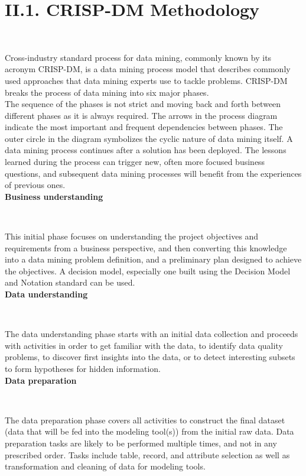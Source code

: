 \documentclass[11pt]{report}
\theoremstyle{plain}
\theoremstyle{definition}
\theoremstyle{definition}
\theoremstyle{proposition}
\begin{document}
\section*{II.1. CRISP-DM Methodology}

\

Cross-industry standard process for data mining, commonly known by its acronym CRISP-DM, is a data mining process model that describes commonly used approaches that data mining experts use to tackle problems. CRISP-DM breaks the process of data mining into six major phases.
\\

The sequence of the phases is not strict and moving back and forth between different phases as it is always required. The arrows in the process diagram indicate the most important and frequent dependencies between phases. The outer circle in the diagram symbolizes the cyclic nature of data mining itself. A data mining process continues after a solution has been deployed. The lessons learned during the process can trigger new, often more focused business questions, and subsequent data mining processes will benefit from the experiences of previous ones.
\\

\textbf{Business understanding}

\

This initial phase focuses on understanding the project objectives and requirements from a business perspective, and then converting this knowledge into a data mining problem definition, and a preliminary plan designed to achieve the objectives. A decision model, especially one built using the Decision Model and Notation standard can be used.
\\

\textbf{Data understanding}

\

The data understanding phase starts with an initial data collection and proceeds with activities in order to get familiar with the data, to identify data quality problems, to discover first insights into the data, or to detect interesting subsets to form hypotheses for hidden information.
\\

\textbf{Data preparation}

\

The data preparation phase covers all activities to construct the final dataset (data that will be fed into the modeling tool(s)) from the initial raw data. Data preparation tasks are likely to be performed multiple times, and not in any prescribed order. Tasks include table, record, and attribute selection as well as transformation and cleaning of data for modeling tools.
\\
\end{document}
